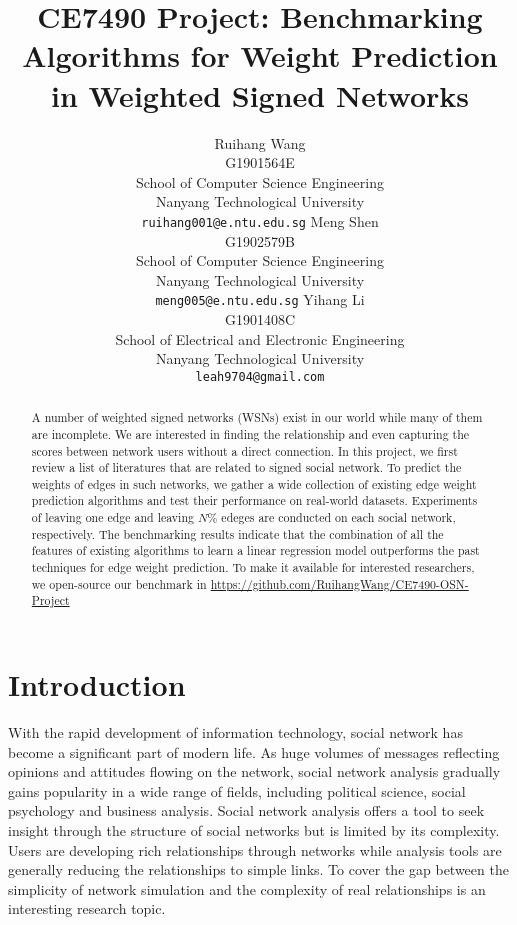 \documentclass{article}
\title{CE7490 Project: Benchmarking Algorithms for Weight Prediction in Weighted Signed Networks}
\author{
  Ruihang Wang\\
  G1901564E\\
  School of Computer Science Engineering\\
  Nanyang Technological University\\
  \texttt{ruihang001@e.ntu.edu.sg} 
  \And
  Meng Shen\\
  G1902579B\\
  School of Computer Science Engineering\\
  Nanyang Technological University\\
  \texttt{meng005@e.ntu.edu.sg}
  \And
  Yihang Li\\
  G1901408C\\
  School of Electrical and Electronic Engineering\\
  Nanyang Technological University\\
  \texttt{leah9704@gmail.com}
}
\begin{document}
\maketitle

\begin{abstract}
  A number of weighted signed networks (WSNs) exist in our world while 
  many of them are incomplete. We are interested in finding the relationship
  and even capturing the scores between network users without a direct connection.
  In this project, we first review a list of literatures that are
  related to signed social network. To predict the weights of edges in 
  such networks, we gather a wide collection of existing edge weight
  prediction algorithms and test their performance on real-world datasets.
  Experiments of leaving one edge and leaving $N\%$ edeges are conducted
  on each social network, respectively. The benchmarking results indicate
  that the combination of all the features of existing algorithms to learn
  a linear regression model outperforms the past techniques for edge weight
  prediction. To make it available for interested researchers, we open-source our benchmark in 
  \url{https://github.com/RuihangWang/CE7490-OSN-Project}
\end{abstract}

\section{Introduction}

With the rapid development of information technology, social 
network has become a significant part of modern life. As 
huge volumes of messages reflecting opinions and attitudes 
flowing on the network, social network analysis gradually gains 
popularity in a wide range of fields, including political 
science, social psychology and business analysis. Social 
network analysis offers a tool to seek insight through 
the structure of social networks but is limited by its 
complexity. Users are developing rich relationships through 
networks while analysis tools are generally reducing the 
relationships to simple links. To cover the gap between 
the simplicity of network simulation and the complexity of real 
relationships is an interesting research topic. 
\end{document}
